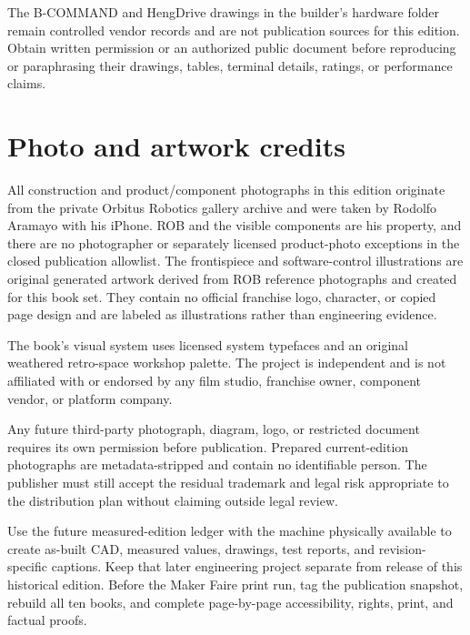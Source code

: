 \documentclass[10pt,openany]{book}
\begin{document}
The B-COMMAND and HengDrive drawings in the builder's hardware folder remain controlled vendor records and are not publication sources for this edition. Obtain written permission or an authorized public document before reproducing or paraphrasing their drawings, tables, terminal details, ratings, or performance claims.

\chapter{Photo and artwork credits}

All construction and product/component photographs in this edition originate from the private Orbitus Robotics gallery archive and were taken by Rodolfo Aramayo with his iPhone. ROB and the visible components are his property, and there are no photographer or separately licensed product-photo exceptions in the closed publication allowlist. The frontispiece and software-control illustrations are original generated artwork derived from ROB reference photographs and created for this book set. They contain no official franchise logo, character, or copied page design and are labeled as illustrations rather than engineering evidence.

The book's visual system uses licensed system typefaces and an original weathered retro-space workshop palette. The project is independent and is not affiliated with or endorsed by any film studio, franchise owner, component vendor, or platform company.

Any future third-party photograph, diagram, logo, or restricted document requires its own permission before publication. Prepared current-edition photographs are metadata-stripped and contain no identifiable person. The publisher must still accept the residual trademark and legal risk appropriate to the distribution plan without claiming outside legal review.

\vfill
\begin{missionbox}[title={NEXT ITERATION}]
Use the future measured-edition ledger with the machine physically available to create as-built CAD, measured values, drawings, test reports, and revision-specific captions. Keep that later engineering project separate from release of this historical edition. Before the Maker Faire print run, tag the publication snapshot, rebuild all ten books, and complete page-by-page accessibility, rights, print, and factual proofs.
\end{missionbox}

\end{document}
